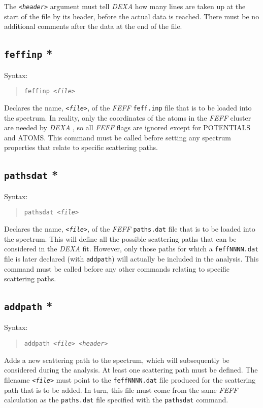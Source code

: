 \documentclass[a4paper,12pt]{report}
\newcommand{\dexa}{\emph{DEXA} }
\newcommand{\feff}{\emph{FEFF} }
\begin{document}
The \texttt{\emph{<header>}} argument must tell \dexa how many lines are taken up at the start of the file by its header, before the actual data is reached. There must be no additional comments after the data at the end of the file.


\subsection{\texttt{feffinp} *}
Syntax:
\begin{quote}
  \texttt{feffinp \emph{<file>}}
\end{quote}
Declares the name, \texttt{\emph{<file>}}, of the \feff  \verb|feff.inp| file that is to be loaded into the spectrum. In reality, only the coordinates of the atoms in the \feff  cluster are needed by \dexa, so all \feff  flags are ignored except for POTENTIALS and ATOMS. This command must be called before setting any spectrum properties that relate to specific scattering paths.

\subsection{\texttt{pathsdat} *}
Syntax:
\begin{quote}
  \texttt{pathsdat \emph{<file>}}
\end{quote}
Declares the name, \texttt{\emph{<file>}}, of the \feff  \verb|paths.dat| file that is to be loaded into the spectrum. This will define all the possible scattering paths that can be considered in the \dexa fit. However, only those paths for which a \verb|feffNNNN.dat| file is later declared (with \verb|addpath|) will actually be included in the analysis. This command must be called before any other commands relating to specific scattering paths.

\subsection{\texttt{addpath} *}
Syntax:
\begin{quote}
  \texttt{addpath \emph{<file> <header>}}
\end{quote}
Adds a new scattering path to the spectrum, which will subsequently be considered during the analysis. At least one scattering path must be defined. The filename \texttt{\emph{<file>}} must point to the \verb|feffNNNN.dat| file produced for the scattering path that is to be added. In turn, this file must come from the same \feff calculation as the \verb|paths.dat| file specified with the \verb|pathsdat| command. 
\end{document}
